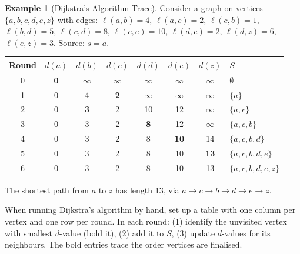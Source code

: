\documentclass[11pt, a4paper, notitlepage]{report}
\theoremstyle{definition}
\newtheorem{example}[theorem]{Example}
\theoremstyle{remark}
\begin{document}
\begin{example}[Dijkstra's Algorithm Trace]
\label{ex:dijkstra-trace}
Consider a graph on vertices $\{a, b, c, d, e, z\}$ with edges: $\ell(a,b)=4$, $\ell(a,c)=2$, $\ell(c,b)=1$, $\ell(b,d)=5$, $\ell(c,d)=8$, $\ell(c,e)=10$, $\ell(d,e)=2$, $\ell(d,z)=6$, $\ell(e,z)=3$. Source: $s = a$.

\begin{center}
\begin{tabular}{c|cccccc|l}
\hline
Round & $d(a)$ & $d(b)$ & $d(c)$ & $d(d)$ & $d(e)$ & $d(z)$ & $S$ \\
\hline
0 & \textbf{0} & $\infty$ & $\infty$ & $\infty$ & $\infty$ & $\infty$ & $\emptyset$ \\
1 & 0 & 4 & \textbf{2} & $\infty$ & $\infty$ & $\infty$ & $\{a\}$ \\
2 & 0 & \textbf{3} & 2 & 10 & 12 & $\infty$ & $\{a, c\}$ \\
3 & 0 & 3 & 2 & \textbf{8} & 12 & $\infty$ & $\{a, c, b\}$ \\
4 & 0 & 3 & 2 & 8 & \textbf{10} & 14 & $\{a, c, b, d\}$ \\
5 & 0 & 3 & 2 & 8 & 10 & \textbf{13} & $\{a, c, b, d, e\}$ \\
6 & 0 & 3 & 2 & 8 & 10 & 13 & $\{a, c, b, d, e, z\}$ \\
\hline
\end{tabular}
\end{center}

The shortest path from $a$ to $z$ has length 13, via $a \to c \to b \to d \to e \to z$.
\end{example}

\begin{examtip}[title={Exam Tip: Dijkstra Table Method}]
When running Dijkstra's algorithm by hand, set up a table with one column per vertex and one row per round. In each round: (1) identify the unvisited vertex with smallest $d$-value (bold it), (2) add it to $S$, (3) update $d$-values for its neighbours. The bold entries trace the order vertices are finalised.
\end{examtip}
\end{document}
